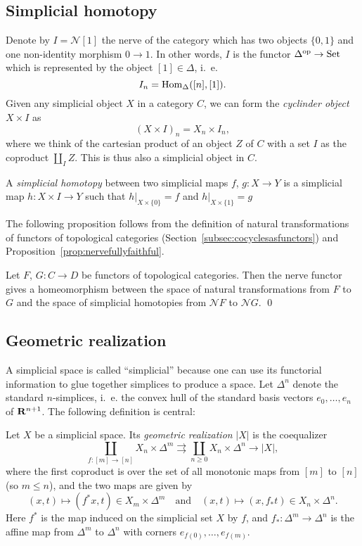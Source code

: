 \documentclass[a4paper,openany]{scrbook}
\newcommand{\nerve}{\mathcal N}
\begin{document}
\subsection{Simplicial homotopy}

Denote by $I=\nerve [1]$ the nerve of the category which has two objects $\{0,1\}$ and one non-identity morphism $0 \to 1$. In other words, $I$ is the functor $\Delta^{\operatorname{op}}\to\operatorname{Set}$ which is represented by the object $[1] \in \Delta$, i.~e.
\[
I_n = \operatorname{Hom}_{\Delta}([n],[1]).
\]
Given any simplicial object $X$ in a category $C$, we can form the \emph{cyclinder object} $X \times I$ as
\[
(X \times I)_n = X_n \times I_n,
\]
where we think of the cartesian product of an object $Z$ of $C$ with a set $I$ as the coproduct $\coprod_I Z$. This is thus also a simplicial object in $C$.

\begin{defn}
A \emph{simplicial homotopy} between two simplicial maps $f$, $g\colon X \to Y$ is a simplicial map $h\colon X \times I \to Y$ such that $h|_{X \times \{0\}} = f$ and $h|_{X \times \{1\}} = g$
\end{defn}

The following proposition follows from the definition of natural transformations of functors of topological categories (Section~\ref{subsec:cocyclesasfunctors}) and Proposition~\ref{prop:nervefullyfaithful}.

\begin{prop}
Let $F$, $G\colon C \to D$ be functors of topological categories. Then the nerve functor gives a homeomorphism between the space of natural transformations from $F$ to $G$ and the space of simplicial homotopies from $\nerve F$ to $\nerve G$. \qed
\end{prop}

\subsection{Geometric realization}

A simplicial space is called “simplicial” because one can use its functorial information to glue together simplices to produce a space. Let $\Delta^n$ denote the standard $n$-simplices, i.~e. the convex hull of the standard basis vectors $e_0,\dots,e_n$ of $\mathbf R^{n+1}$. The following definition is central:

\begin{defn}
Let $X$ be a simplicial space. Its \emph{geometric realization} $|X|$ is the coequalizer
\[
\coprod_{f\colon [m] \to [n]} X_n \times \Delta^m \rightrightarrows \coprod_{n \geq 0} X_n \times \Delta^n \to |X|,
\]
where the first coproduct is over the set of all monotonic maps from $[m]$ to $[n]$ (so $m \leq n$), and the two maps are given by
\[
(x,t) \mapsto (f^*x,t) \in X_m \times \Delta^m \quad \text{and} \quad (x,t) \mapsto (x,f_*t) \in X_n \times \Delta^n.
\]
Here $f^*$ is the map induced on the simplicial set $X$ by $f$, and $f_*\colon \Delta^m \to \Delta^n$ is the affine map from $\Delta^m$ to $\Delta^n$ with corners $e_{f(0)},\dots,e_{f(m)}$.
\end{defn}
\end{document}
